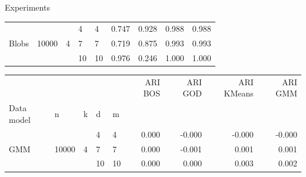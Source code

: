 \documentclass{beamer}
\begin{document}
\begin{frame}{Experiments}
{\begin{table}[H]
\begin{minipage}{.48\columnwidth}
\begin{adjustbox}{width=\columnwidth}
\begin{tabular}{lllllrrrr}
        \cline{1-9}
        \multirow[t]{3}{*}{Blobs} & \multirow[t]{3}{*}{10000} & \multirow[t]{3}{*}{4} & 4 & 4 & 0.747 & 0.928 & 0.988 & 0.988 \\
        \cline{4-9}
         &  &  & 7 & 7 & 0.719 & 0.875 & 0.993 & 0.993 \\
        \cline{4-9}
         &  &  & 10 & 10 & 0.976 & 0.246 & 1.000 & 1.000 \\
        \end{tabular}
        \end{adjustbox}
        \end{minipage}
        \begin{minipage}{.48\columnwidth}
        \begin{adjustbox}{width=\columnwidth}
        \begin{tabular}{lllllrrrr}
         &  &  &  &  & ARI BOS & ARI GOD & ARI KMeans & ARI GMM \\
        Data model & n & k & d & m &  &  &  &  \\
        \cline{1-9}
        \multirow[t]{3}{*}{GMM} & \multirow[t]{3}{*}{10000} & \multirow[t]{3}{*}{4} & 4 & 4 & 0.000 & -0.000 & -0.000 & -0.000 \\
        \cline{4-9}
         &  &  & 7 & 7 & 0.000 & -0.001 & 0.001 & 0.001 \\
        \cline{4-9}
         &  &  & 10 & 10 & 0.000 & 0.000 & 0.003 & 0.002 \\
        \end{tabular}
        \end{adjustbox}
        \end{minipage}
    \end{table}
    }


    
\end{frame}
\end{document}
